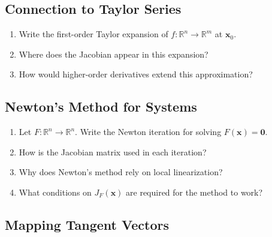 \subsection{Connection to Taylor Series}

\begin{enumerate}[resume]
  \item Write the first-order Taylor expansion of $f : \mathbb{R}^n \to \mathbb{R}^m$ at $\mathbf{x}_0$.
  \item Where does the Jacobian appear in this expansion?
  \item How would higher-order derivatives extend this approximation?
\end{enumerate}

\subsection{Newton's Method for Systems}

\begin{enumerate}[resume]
  \item Let $F : \mathbb{R}^n \to \mathbb{R}^n$. Write the Newton iteration for solving $F(\mathbf{x}) = \mathbf{0}$.
  \item How is the Jacobian matrix used in each iteration?
  \item Why does Newton's method rely on local linearization?
  \item What conditions on $J_F(\mathbf{x})$ are required for the method to work?
\end{enumerate}

\subsection{Mapping Tangent Vectors}

